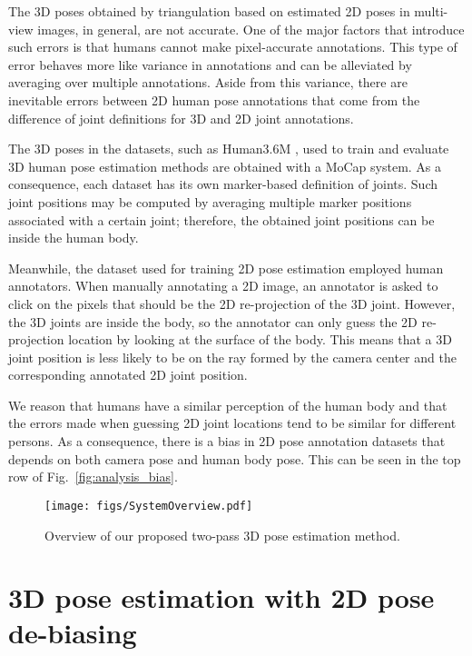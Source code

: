 \documentclass{article}
\begin{document}
The 3D poses obtained by triangulation based on estimated 2D poses in multi-view images, in general, are not accurate. 
One of the major factors that introduce such errors is that humans cannot make pixel-accurate annotations. This type of error behaves more like variance in annotations and can be alleviated by averaging over multiple annotations.
Aside from this variance, there are inevitable errors between 2D human pose annotations that come from the difference of joint definitions for 3D and 2D joint annotations.

The 3D poses in the datasets, such as Human3.6M \cite{ionescu2013human3}, used to train and evaluate 3D human pose estimation methods are obtained with a MoCap system. As a consequence, each dataset has its own marker-based definition of joints. Such joint positions may be computed by averaging multiple marker positions associated with a certain joint; therefore, the obtained joint positions can be inside the human body. 

Meanwhile, the dataset used for training 2D pose estimation employed human annotators. When manually annotating a 2D image, an annotator is asked to click on the pixels that should be the 2D re-projection of the 3D joint. However, the 3D joints are inside the body, so the annotator can only guess the 2D re-projection location by looking at the surface of the body.
This means that a 3D joint position is less likely to be on the ray formed by the camera center and the corresponding annotated 2D joint position.  

We reason that humans have a similar perception of the human body and that the errors made when guessing 2D joint locations tend to be similar for different persons. As a consequence, there is a bias in 2D pose annotation datasets that depends on both camera pose and human body pose. This can be seen in the top row of  Fig.~\ref{fig:analysis_bias}.

\begin{figure}[t]
    \centering
    \texttt{[image: figs/SystemOverview.pdf]}
    \vspace{-0.5cm}
    \caption{Overview of our proposed two-pass 3D pose estimation method. }
    \label{fig:overview}
    \vspace{-0.3cm}
\end{figure}

\vspace{-0.2cm}
\section{3D pose estimation with 2D pose de-biasing} \label{sec:3Dpose}
\vspace{-0.2cm}
\end{document}
